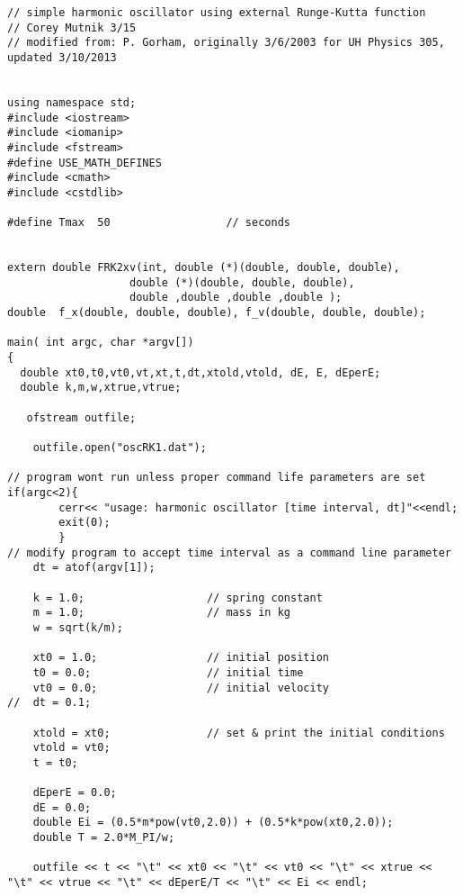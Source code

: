 \documentclass[11pt]{article}
\begin{document}

%

\begin{lstlisting}
// simple harmonic oscillator using external Runge-Kutta function
// Corey Mutnik 3/15
// modified from: P. Gorham, originally 3/6/2003 for UH Physics 305, updated 3/10/2013


using namespace std;
#include <iostream>
#include <iomanip>
#include <fstream>
#define USE_MATH_DEFINES
#include <cmath>
#include <cstdlib> 

#define Tmax  50                  // seconds


extern double FRK2xv(int, double (*)(double, double, double), 
				   double (*)(double, double, double), 
				   double ,double ,double ,double );
double  f_x(double, double, double), f_v(double, double, double);

main( int argc, char *argv[])
{
  double xt0,t0,vt0,vt,xt,t,dt,xtold,vtold, dE, E, dEperE;
  double k,m,w,xtrue,vtrue;
  
   ofstream outfile;  
   
	outfile.open("oscRK1.dat");
	
// program wont run unless proper command life parameters are set  
if(argc<2){
		cerr<< "usage: harmonic oscillator [time interval, dt]"<<endl;
		exit(0);
		}
// modify program to accept time interval as a command line parameter
	dt = atof(argv[1]);

	k = 1.0;                   // spring constant
	m = 1.0;                   // mass in kg
	w = sqrt(k/m);
	
	xt0 = 1.0;                 // initial position
	t0 = 0.0;                  // initial time
	vt0 = 0.0;                 // initial velocity
//	dt = 0.1;

	xtold = xt0;               // set & print the initial conditions
	vtold = vt0;
	t = t0;

	dEperE = 0.0;
	dE = 0.0;
	double Ei = (0.5*m*pow(vt0,2.0)) + (0.5*k*pow(xt0,2.0));
	double T = 2.0*M_PI/w;
	
	outfile << t << "\t" << xt0 << "\t" << vt0 << "\t" << xtrue << "\t" << vtrue << "\t" << dEperE/T << "\t" << Ei << endl;




\end{lstlisting}
\end{document}
